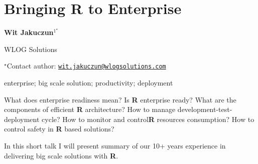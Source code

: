 \documentclass[\main/boa.tex]{subfiles}
\begin{document}
\section{Bringing R to Enterprise}

\begin{center}
  {\bf {} Wit Jakuczun$^{1^\star}$}
\end{center}

\vskip 0.3cm

\begin{affiliations}
\begin{enumerate}
\begin{minipage}{0.915\textwidth}
\centering
\item WLOG Solutions \\[-2pt]
\end{minipage}
\end{enumerate}
$^\star$Contact author: \href{mailto:wit.jakuczun@wlogsolutions.com}{\nolinkurl{wit.jakuczun@wlogsolutions.com}}\\
\end{affiliations}

\vskip 0.5cm

\begin{minipage}{0.915\textwidth}
\keywords enterprise; big scale solution; productivity; deployment
\end{minipage}

\vskip 0.8cm

What does enterprise readiness mean? Is \textbf{R} enterprise ready? 
What are the components of efficient \textbf{R} architecture?
How to manage development-test-deployment cycle? How to monitor and 
control\textbf{R} resources consumption? How to control safety in 
\textbf{R} based solutions?

In this short talk I will present summary of our 10+ years experience in
delivering big scale solutions with \textbf{R}. 
\end{document}
